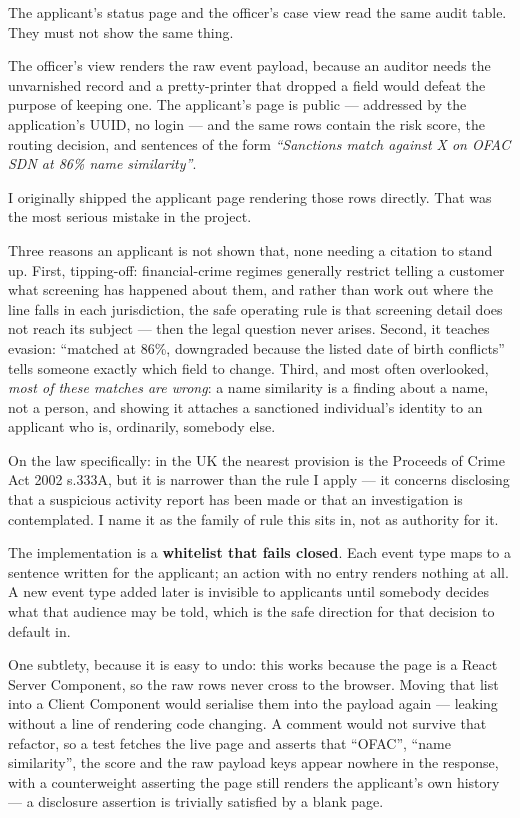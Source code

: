 \documentclass[11pt,a4paper]{article}
\begin{document}
The applicant's status page and the officer's case view read the same audit
table. They must not show the same thing.

The officer's view renders the raw event payload, because an auditor needs the
unvarnished record and a pretty-printer that dropped a field would defeat the
purpose of keeping one. The applicant's page is public --- addressed by the
application's UUID, no login --- and the same rows contain the risk score, the
routing decision, and sentences of the form \emph{``Sanctions match against X on
OFAC SDN at 86\% name similarity''}.

I originally shipped the applicant page rendering those rows directly. That was
the most serious mistake in the project.

Three reasons an applicant is not shown that, none needing a citation to stand
up. First, tipping-off: financial-crime regimes generally restrict telling a
customer what screening has happened about them, and rather than work out where
the line falls in each jurisdiction, the safe operating rule is that screening
detail does not reach its subject --- then the legal question never arises.
Second, it teaches evasion: ``matched at 86\%, downgraded because the listed date
of birth conflicts'' tells someone exactly which field to change. Third, and most
often overlooked, \emph{most of these matches are wrong}: a name similarity is a
finding about a name, not a person, and showing it attaches a sanctioned
individual's identity to an applicant who is, ordinarily, somebody else.

On the law specifically: in the UK the nearest provision is the Proceeds of
Crime Act 2002 s.333A, but it is narrower than the rule I apply --- it concerns
disclosing that a suspicious activity report has been made or that an
investigation is contemplated. I name it as the family of rule this sits in, not
as authority for it.

The implementation is a \textbf{whitelist that fails closed}. Each event type
maps to a sentence written for the applicant; an action with no entry renders
nothing at all. A new event type added later is invisible to applicants until
somebody decides what that audience may be told, which is the safe direction for
that decision to default in.

One subtlety, because it is easy to undo: this works because the page is a
React Server Component, so the raw rows never cross to the browser. Moving that
list into a Client Component would serialise them into the payload again ---
leaking without a line of rendering code changing. A comment would not survive
that refactor, so a test fetches the live page and asserts that ``OFAC'', ``name
similarity'', the score and the raw payload keys appear nowhere in the response,
with a counterweight asserting the page still renders the applicant's own
history --- a disclosure assertion is trivially satisfied by a blank page.
\end{document}
